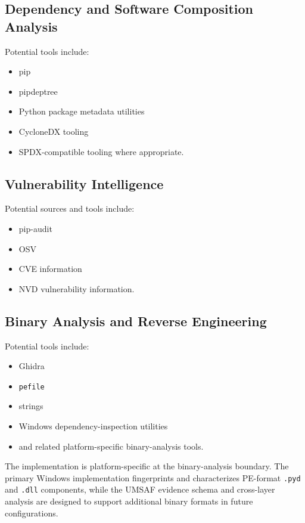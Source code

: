 \documentclass[
  12pt,
  letterpaper,
  oneside]{report}
\providecommand{\tightlist}{%
  \setlength{\itemsep}{0pt}\setlength{\parskip}{0pt}}
\begin{document}
\subsection{Dependency and Software Composition
Analysis}\label{dependency-and-software-composition-analysis}

Potential tools include:

\begin{itemize}
\tightlist
\item
  pip
\item
  pipdeptree
\item
  Python package metadata utilities
\item
  CycloneDX tooling
\item
  SPDX-compatible tooling where appropriate.
\end{itemize}

\subsection{Vulnerability
Intelligence}\label{vulnerability-intelligence}

Potential sources and tools include:

\begin{itemize}
\tightlist
\item
  pip-audit
\item
  OSV
\item
  CVE information
\item
  NVD vulnerability information.
\end{itemize}

\subsection{Binary Analysis and Reverse
Engineering}\label{binary-analysis-and-reverse-engineering}

Potential tools include:

\begin{itemize}
\tightlist
\item
  Ghidra
\item
  \texttt{pefile}
\item
  strings
\item
  Windows dependency-inspection utilities
\item
  and related platform-specific binary-analysis tools.
\end{itemize}

The implementation is platform-specific at the binary-analysis boundary.
The primary Windows implementation fingerprints and characterizes
PE-format \texttt{.pyd} and \texttt{.dll} components, while the UMSAF
evidence schema and cross-layer analysis are designed to support
additional binary formats in future configurations.
\end{document}
